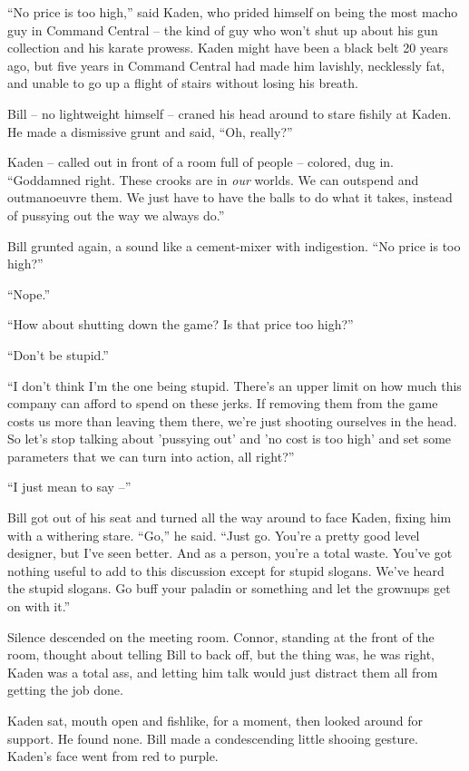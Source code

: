 ``No price is too high,'' said Kaden, who prided himself on being the
most macho guy in Command Central -- the kind of guy who won't shut
up about his gun collection and his karate prowess. Kaden might
have been a black belt 20 years ago, but five years in Command
Central had made him lavishly, necklessly fat, and unable to go up
a flight of stairs without losing his breath.

Bill -- no lightweight himself -- craned his head around to stare
fishily at Kaden. He made a dismissive grunt and said, ``Oh,
really?''

Kaden -- called out in front of a room full of people -- colored,
dug in. ``Goddamned right. These crooks are in \emph{our} worlds. We
can outspend and outmanoeuvre them. We just have to have the balls
to do what it takes, instead of pussying out the way we always
do.''

Bill grunted again, a sound like a cement-mixer with indigestion.
``No price is too high?''

``Nope.''

``How about shutting down the game? Is that price too high?''

``Don't be stupid.''

``I don't think I'm the one being stupid. There's an upper limit on
how much this company can afford to spend on these jerks. If
removing them from the game costs us more than leaving them there,
we're just shooting ourselves in the head. So let's stop talking
about 'pussying out' and 'no cost is too high' and set some
parameters that we can turn into action, all right?''

``I just mean to say --''

Bill got out of his seat and turned all the way around to face
Kaden, fixing him with a withering stare. ``Go,'' he said. ``Just go.
You're a pretty good level designer, but I've seen better. And as a
person, you're a total waste. You've got nothing useful to add to
this discussion except for stupid slogans. We've heard the stupid
slogans. Go buff your paladin or something and let the grownups get
on with it.''

Silence descended on the meeting room. Connor, standing at the
front of the room, thought about telling Bill to back off, but the
thing was, he was right, Kaden was a total ass, and letting him
talk would just distract them all from getting the job done.

Kaden sat, mouth open and fishlike, for a moment, then looked
around for support. He found none. Bill made a condescending little
shooing gesture. Kaden's face went from red to purple.

